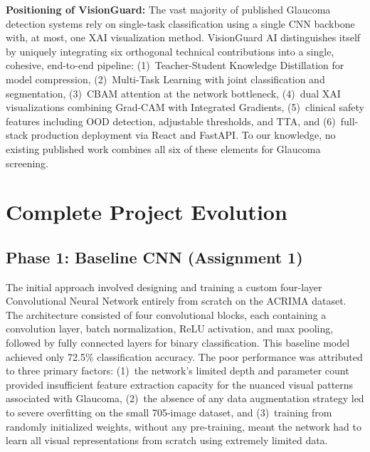 \documentclass[conference]{IEEEtran}
\begin{document}
\smallskip
\noindent\textbf{Positioning of VisionGuard:} The vast majority of published Glaucoma detection systems rely on single-task classification using a single CNN backbone with, at most, one XAI visualization method. VisionGuard AI distinguishes itself by uniquely integrating six orthogonal technical contributions into a single, cohesive, end-to-end pipeline: (1)~Teacher-Student Knowledge Distillation for model compression, (2)~Multi-Task Learning with joint classification and segmentation, (3)~CBAM attention at the network bottleneck, (4)~dual XAI visualizations combining Grad-CAM with Integrated Gradients, (5)~clinical safety features including OOD detection, adjustable thresholds, and TTA, and (6)~full-stack production deployment via React and FastAPI. To our knowledge, no existing published work combines all six of these elements for Glaucoma screening.

\section{Complete Project Evolution}

\subsection{Phase 1: Baseline CNN (Assignment 1)}
The initial approach involved designing and training a custom four-layer Convolutional Neural Network entirely from scratch on the ACRIMA dataset. The architecture consisted of four convolutional blocks, each containing a convolution layer, batch normalization, ReLU activation, and max pooling, followed by fully connected layers for binary classification. This baseline model achieved only 72.5\% classification accuracy. The poor performance was attributed to three primary factors: (1)~the network's limited depth and parameter count provided insufficient feature extraction capacity for the nuanced visual patterns associated with Glaucoma, (2)~the absence of any data augmentation strategy led to severe overfitting on the small 705-image dataset, and (3)~training from randomly initialized weights, without any pre-training, meant the network had to learn all visual representations from scratch using extremely limited data.
\end{document}
